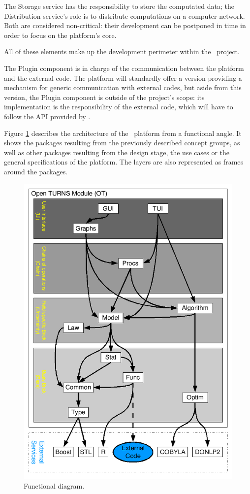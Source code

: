 The Storage service has the responsibility to store the computated data; the Distribution service's role is to distribute computations on a computer network. Both are considered non-critical: their development can be postponed in time in order to focus on the platform's core.

All of these elements make up the development perimeter within the \OT\ project.

The Plugin component is in charge of the communication between the platform and the external code. The platform will standardly offer a version providing a mechanism for generic communication with external codes, but aside from this version, the Plugin component is outside of the project's scope: its implementation is the responsibility of the external code, which will have to follow the API provided by \OT.


Figure \ref{fig:functional_diagram} describes the architecture of the \OT\ platform from a functional angle. It shows the packages resulting from the previously described concept groups, as well as other packages resulting from the design stage, the use cases or the general specifications of the platform. The layers are also represented as frames around the packages.

\begin{figure}[htb]
  \begin{center}
    \includegraphics[scale=0.7]{Figures/analysis/functional_diagram.png}
    \caption{Functional diagram.}\label{fig:functional_diagram}
  \end{center}
\end{figure}
